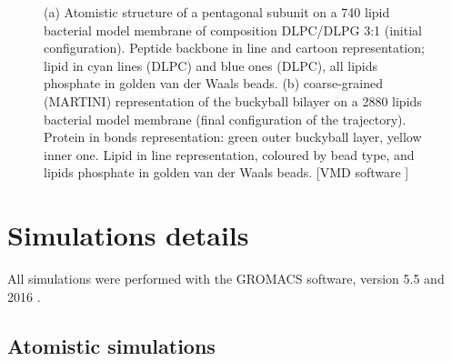 \begin{figure}[t]
\centering
{}
\caption[Snapshot of simulations of capzip on model membranes]{(a) Atomistic structure of a pentagonal subunit on a 740 lipid bacterial model membrane of composition DLPC/DLPG 3:1 (initial configuration). Peptide backbone in line and cartoon representation; lipid in cyan lines (DLPC) and blue ones (DLPC), all lipids phosphate in golden van der Waals beads. (b) coarse-grained (MARTINI) representation of the buckyball bilayer on a 2880 lipids bacterial model membrane (final configuration of the trajectory). Protein in bonds representation: green outer buckyball layer, yellow inner one. Lipid in line representation, coloured by bead type, and lipids phosphate in golden van der Waals beads. [VMD software \citet{HUMP96}]}
\label{fig:pL6_vmd}
\end{figure}
\section{Simulations details} \label{sec:details}

All simulations were performed with the GROMACS software, version 5.5 and 2016 \citep{Berendsen1995,Abraham2015,gromacs_man}. 

\subsection{Atomistic simulations}
